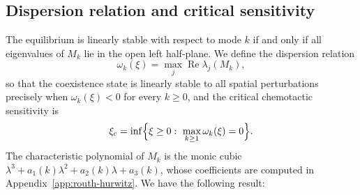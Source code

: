 \documentclass[a4paper,fleqn,longmktitle]{cas-sc}
\theoremstyle{plain}
\theoremstyle{definition}
\numberwithin{equation}{section}
\begin{document}
\subsection{Dispersion relation and critical sensitivity}
\label{subsec:dispersion-relation}

The equilibrium is linearly stable with respect to mode $k$ if and only if all
eigenvalues of $M_k$ lie in the open left half-plane. We define the dispersion
relation
\begin{equation}\label{eq:dispersion}
\omega_k(\xi)=\max_j\operatorname{Re}\lambda_j(M_k),
\end{equation}
so that the coexistence state is linearly stable to all spatial perturbations
precisely when $\omega_k(\xi)<0$ for every $k\ge0$, and the critical chemotactic
sensitivity is
\begin{equation}\label{eq:xic-definition}
\xi_c=\inf\Bigl\{\xi\ge0:\ \max_{k\ge1}\omega_k(\xi)=0\Bigr\}.
\end{equation}
The characteristic polynomial of $M_k$ is the monic cubic $\lambda^3+a_1(k)\lambda^2+a_2(k)\lambda+a_3(k)$, whose coefficients are computed
in Appendix~\ref{app:routh-hurwitz}. We have the following result:
\end{document}
